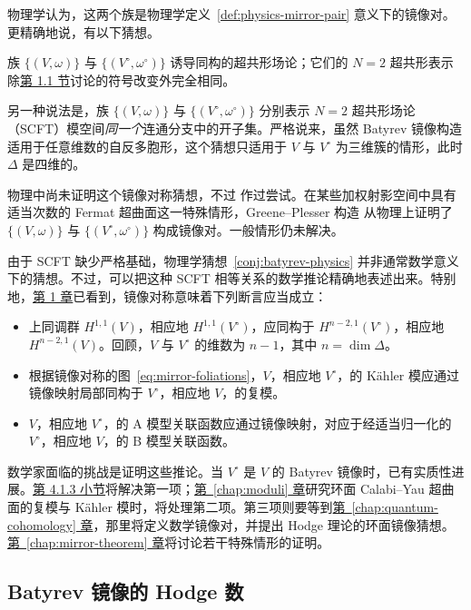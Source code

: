 物理学认为，这两个族是物理学定义~\ref{def:physics-mirror-pair} 意义下的镜像对。更精确地说，有以下猜想。
\begin{physicsconjecture}\label{conj:batyrev-physics}
族 $\{(V,\omega)\}$ 与 $\{(V^\circ,\omega^\circ)\}$ 诱导同构的超共形场论；它们的 $N=2$ 超共形表示除\hyperref[sec:physics]{第 1.1 节}讨论的符号改变外完全相同。
\end{physicsconjecture}

另一种说法是，族 $\{(V,\omega)\}$ 与 $\{(V^\circ,\omega^\circ)\}$ 分别表示 $N=2$ 超共形场论（SCFT）模空间\emph{同一个}连通分支中的开子集。严格说来，虽然 Batyrev 镜像构造适用于任意维数的自反多胞形，这个猜想只适用于 $V$ 与 $V^\circ$ 为三维簇的情形，此时 $\Delta$ 是四维的。

物理中尚未证明这个镜像对称猜想，不过  作过尝试。在某些加权射影空间中具有适当次数的 Fermat 超曲面这一特殊情形，Greene--Plesser 构造  从物理上证明了 $\{(V,\omega)\}$ 与 $\{(V^\circ,\omega^\circ)\}$ 构成镜像对。一般情形仍未解决。

由于 SCFT 缺少严格基础，物理学猜想~\ref{conj:batyrev-physics} 并非通常数学意义下的猜想。不过，可以把这种 SCFT 相等关系的数学推论精确地表述出来。特别地，\hyperref[chap:introduction]{第 1 章}已看到，镜像对称意味着下列断言应当成立：
\begin{itemize}
\item 上同调群 $H^{1,1}(V)$，相应地 $H^{1,1}(V^\circ)$，应同构于 $H^{n-2,1}(V^\circ)$，相应地 $H^{n-2,1}(V)$。回顾，$V$ 与 $V^\circ$ 的维数为 $n-1$，其中 $n=\dim\Delta$。
\item 根据镜像对称的图~\eqref{eq:mirror-foliations}，$V$，相应地 $V^\circ$，的 Kähler 模应通过镜像映射局部同构于 $V^\circ$，相应地 $V$，的复模。
\item $V$，相应地 $V^\circ$，的 A 模型关联函数应通过镜像映射，对应于经适当归一化的 $V^\circ$，相应地 $V$，的 B 模型关联函数。
\end{itemize}
数学家面临的挑战是证明这些推论。当 $V^\circ$ 是 $V$ 的 Batyrev 镜像时，已有实质性进展。\hyperref[subsec:batyrev-hodge]{第 4.1.3 小节}将解决第一项；\hyperref[chap:moduli]{第~\ref*{chap:moduli} 章}研究环面 Calabi--Yau 超曲面的复模与 Kähler 模时，将处理第二项。第三项则要等到\hyperref[chap:quantum-cohomology]{第~\ref*{chap:quantum-cohomology} 章}，那里将定义数学镜像对，并提出 Hodge 理论的环面镜像猜想。\hyperref[chap:mirror-theorem]{第~\ref*{chap:mirror-theorem} 章}将讨论若干特殊情形的证明。

\subsection{Batyrev 镜像的 Hodge 数}\label{subsec:batyrev-hodge}

